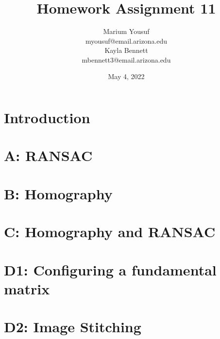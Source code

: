 \documentclass{article}[12pt]
\begin{document}
\title{Homework Assignment 11}
\date{May 4, 2022}

\author{
  Marium Yousuf\\
  myousuf@email.arizona.edu\\
  Kayla Bennett \\
  mbennett3@email.arizona.edu
}

\maketitle
\noindent

\section{Introduction}


\section{A: RANSAC}

\clearpage
\section{B: Homography}

\clearpage
\section{C: Homography and RANSAC}

\clearpage
\section{D1: Configuring a fundamental matrix}

\section{D2: Image Stitching}

% 
\end{document}
